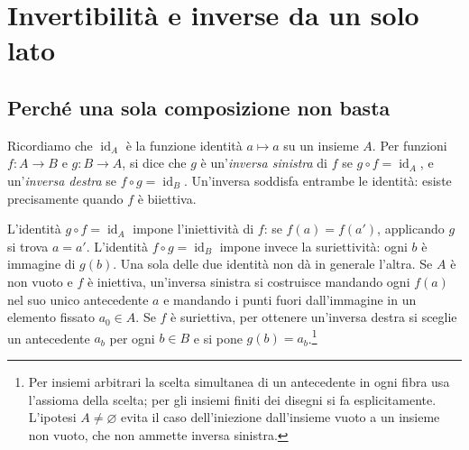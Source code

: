 \section{Invertibilità e inverse da un solo lato}
\label{sec:invertibilita-applicazioni}
\subsection{Perché una sola composizione non basta}
Ricordiamo che $\operatorname{id}_A$ è la funzione identità $a\mapsto a$ su un insieme $A$. Per funzioni $f:A\to B$ e $g:B\to A$, si dice che $g$ è un'\emph{inversa sinistra} di $f$ se $g\circ f=\operatorname{id}_A$, e un'\emph{inversa destra} se $f\circ g=\operatorname{id}_B$. Un'inversa soddisfa entrambe le identità: esiste precisamente quando $f$ è biiettiva.

L'identità $g\circ f=\operatorname{id}_A$ impone l'iniettività di $f$: se $f(a)=f(a')$, applicando $g$ si trova $a=a'$. L'identità $f\circ g=\operatorname{id}_B$ impone invece la suriettività: ogni $b$ è immagine di $g(b)$. Una sola delle due identità non dà in generale l'altra.
Se $A$ è non vuoto e $f$ è iniettiva, un'inversa sinistra si costruisce mandando ogni $f(a)$ nel suo unico antecedente $a$ e mandando i punti fuori dall'immagine in un elemento fissato $a_0\in A$. Se $f$ è suriettiva, per ottenere un'inversa destra si sceglie un antecedente $a_b$ per ogni $b\in B$ e si pone $g(b)=a_b$.\footnote{Per insiemi arbitrari la scelta simultanea di un antecedente in ogni fibra usa l'assioma della scelta; per gli insiemi finiti dei disegni si fa esplicitamente. L'ipotesi $A\ne\varnothing$ evita il caso dell'iniezione dall'insieme vuoto a un insieme non vuoto, che non ammette inversa sinistra.}

